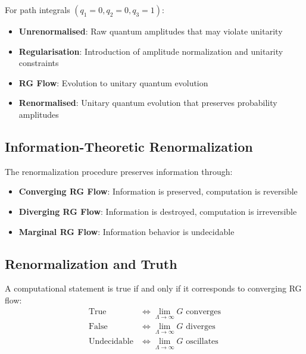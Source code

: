 \begin{theorem}
\label{thm:path-renorm}
For path integrals $(q_1=0, q_2=0, q_3=1)$:
\begin{itemize}
\item \textbf{Unrenormalised}: Raw quantum amplitudes that may violate unitarity
\item \textbf{Regularisation}: Introduction of amplitude normalization and unitarity constraints
\item \textbf{RG Flow}: Evolution to unitary quantum evolution
\item \textbf{Renormalised}: Unitary quantum evolution that preserves probability amplitudes
\end{itemize}
\end{theorem}

\subsection{Information-Theoretic Renormalization}

\begin{definition}
\label{def:info-renorm}
The renormalization procedure preserves information through:
\begin{itemize}
\item \textbf{Converging RG Flow}: Information is preserved, computation is reversible
\item \textbf{Diverging RG Flow}: Information is destroyed, computation is irreversible
\item \textbf{Marginal RG Flow}: Information behavior is undecidable
\end{itemize}
\end{definition}

\subsection{Renormalization and Truth}

\begin{theorem}
\label{thm:renorm-truth}
A computational statement is true if and only if it corresponds to converging RG flow:
\begin{align}
\text{True} &\Leftrightarrow \lim_{\Lambda \to \infty} G \text{ converges} \\
\text{False} &\Leftrightarrow \lim_{\Lambda \to \infty} G \text{ diverges} \\
\text{Undecidable} &\Leftrightarrow \lim_{\Lambda \to \infty} G \text{ oscillates}
\end{align}
\end{theorem}

